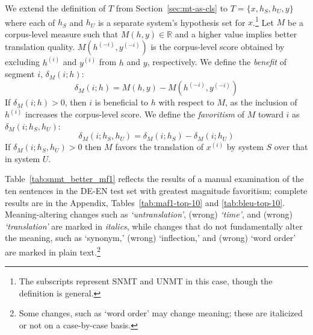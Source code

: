 We extend the definition of $T$ from Section~\ref{sec:mt-as-cls} to $T = \{ x, h_S, h_U, y\}$ where each of $h_S$ and $h_U$ is a separate system's hypothesis set for $x$.\footnote{The subscripts represent SNMT and UNMT in this case, though the definition is general.}
Let $M$ be a corpus-level measure such that $M(h, y) \in \mathbb{R}$ and a higher value implies better translation quality. $M(h^{(-i)}, y^{(-i)})$ is the corpus-level score obtained by excluding $h^{(i)}$ and $y^{(i)}$ from $h$ and $y$, respectively. We define the \textit{benefit} of segment $i$, $\delta_{M} (i; h)$:
$$\delta_{M} (i; h) = M(h, y) - M(h^{(-i)}, y^{(-i)})$$
If $\delta_{M} (i; h) > 0$, then $i$ is beneficial to $h$ with respect to $M$, as the inclusion of $h^{(i)}$ increases the corpus-level score. 
We define the \textit{favoritism} of $M$ toward $i$ as $\delta_{M} (i; h_S, h_U)$:
\begin{equation}
\delta_{M} (i; h_S, h_U) =\delta_{M} (i; h_S) - \delta_{M} (i; h_U)
\label{eq:deleterious}
\end{equation}
If $\delta_{M} (i; h_S, h_U) > 0$ then $M$ favors the translation of $x^{(i)}$ by system $S$ over that in system $U$. %


Table~\ref{tab:snmt_better_mf1} reflects the results of a manual examination of the ten sentences in the DE-EN test set with greatest magnitude favoritism; complete results are in the Appendix, Tables~\ref{tab:maf1-top-10} and \ref{tab:bleu-top-10}. Meaning-altering changes such as \textit{`untranslation'}, (wrong) \textit{`time'}, and (wrong) \textit{`translation'} are marked in \textit{italics}, while changes that do not fundamentally alter the meaning, such as `synonym,' (wrong) `inflection,' and (wrong) `word order' are marked in plain text.\footnote{Some changes, such as `word order' may change meaning; these are italicized or not on a case-by-case basis.} 


